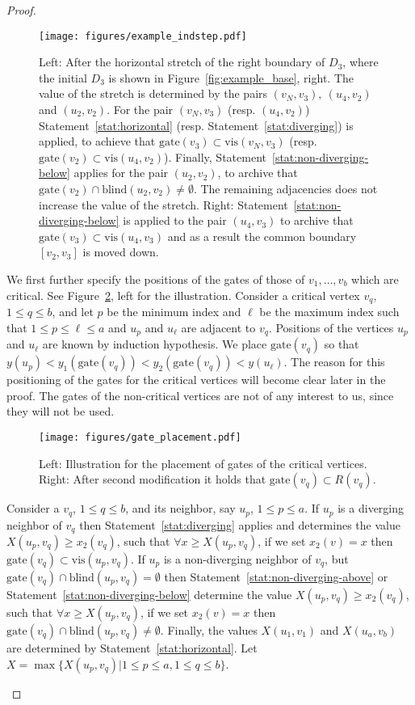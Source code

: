 \documentclass{llncs}
\newcommand{\gate}{\textrm{gate}}
\newcommand{\vis}{\textrm{vis}}
\newcommand{\blind}{\textrm{blind}}
\begin{document}
\begin{proof}
\begin{description}
\begin{figure}[htb]
\centering
\texttt{[image: figures/example\_indstep.pdf]}
\caption{\small Left:  After the horizontal stretch of the right boundary of $D_{3}$, where the initial $D_{3}$ is shown in Figure~\ref{fig:example_base}, right. The value of the stretch is determined by the pairs $(v_N,v_3),~(u_4,v_2)$ and $(u_2,v_2)$. For the pair $(v_N,v_3)$ (resp. $(u_4,v_2)$)  Statement~\ref{stat:horizontal} (resp. Statement~\ref{stat:diverging}) is applied, to achieve that $\gate(v_3) \subset \vis(v_N,v_3)$ (resp. $\gate(v_2) \subset \vis(u_4,v_2)$).  Finally, Statement~\ref{stat:non-diverging-below} applies for the pair $(u_2,v_2)$, to archive that $\gate(v_2) \cap \blind(u_2,v_2) \neq \emptyset$.  The remaining adjacencies does not increase the value of the stretch. Right: Statement~\ref{stat:non-diverging-below} is applied to the pair $(u_4,v_3)$ to archive that $\gate(v_3) \subset \vis(u_4,v_3)$  and as a result the common boundary $[v_2,v_3]$ is moved down.}
\label{fig:example_indstep} 
\end{figure}

We first further specify the positions of the gates of those of $v_1,\dots,v_b$ which are critical. See Figure~\ref{fig:gate_placement}, left for the illustration.  Consider a critical vertex $v_q$, $1\leq q \leq b$, and let  $p$ be the minimum index and $\ell$ be the maximum index such that $1\leq p \leq \ell \leq a$ and $u_p$ and $u_\ell$  are adjacent to $v_q$. Positions of the vertices $u_p$ and $u_\ell$ are known by induction hypothesis. We place $\gate(v_q)$ so that $y(u_p)< y_1(\gate(v_q))<y_2(\gate(v_q))<y(u_\ell)$. The reason for this positioning of the gates for the critical vertices will become clear later in the proof.  The gates of the non-critical vertices are not of any interest to us, since they will not be used. 


\begin{figure}[htb]
\centering
\texttt{[image: figures/gate\_placement.pdf]}
\caption{\small Left: Illustration for the placement of gates of the critical vertices. Right: After second modification it holds that $\gate(v_q) \subset R(v_q)$. }
\label{fig:gate_placement} 
\end{figure}

Consider a $v_q$, $1 \leq q \leq b$, and its neighbor, say $u_p$, $1\leq p \leq a$. If $u_p$ is a diverging neighbor of $v_q$ then  Statement~\ref{stat:diverging} applies and determines the value $X(u_p,v_q)\geq x_2(v_q)$,  such that  $\forall x\geq X(u_p,v_q)$,  if we set $x_2(v) = x$  then $\gate(v_q) \subset \vis(u_p,v_q)$.  If $u_p$ is a non-diverging neighbor of $v_q$, but $\gate(v_q) \cap \blind(u_p,v_q) = \emptyset$ then Statement~\ref{stat:non-diverging-above} or Statement~\ref{stat:non-diverging-below} determine the value $X(u_p,v_q)\geq x_2(v_q)$, such that $\forall x\geq X(u_p,v_q)$,  if we set $x_2(v) = x$  then $\gate(v_q) \cap \blind(u_p,v_q) \neq \emptyset$.   Finally, the values $X(u_1,v_1)$ and $X(u_a,v_b)$ are determined by Statement~\ref{stat:horizontal}.
Let $X = \max\{X(u_p,v_q) | 1\leq p \leq a, 1\leq q \leq b\}$.


\end{description}
\end{proof}
\end{document}
